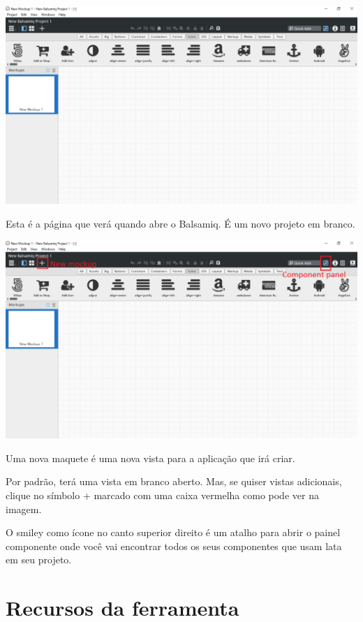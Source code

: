 \documentclass{tufte-book} %
\begin{document}
\begin{center}
	\includegraphics{img3.png}
\end{center}

Esta é a página que verá quando abre o Balsamiq. É um novo projeto em branco.

\begin{center}
	\includegraphics{img4.png}
\end{center}

Uma nova maquete é uma nova vista para a aplicação que irá criar.

Por padrão, terá uma vista em branco aberto. Mas, se quiser vistas adicionais, clique no símbolo + marcado com uma caixa vermelha como pode ver na imagem.

O smiley como ícone no canto superior direito é um atalho para abrir o painel componente onde você vai encontrar todos os seus componentes que usam lata em seu projeto.

\chapter{Recursos da ferramenta}
\end{document}

